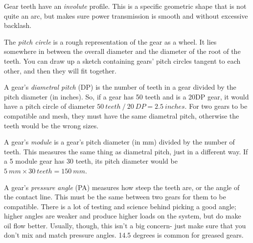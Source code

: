\documentclass[10pt,letterpaper]{book}
\begin{document}
\begin{asparaenum}[a)]
	\item Gear teeth have an \textit{involute} profile. This is a specific geometric shape that is not quite an arc, but makes sure power transmission is smooth and without excessive backlash.
	\item The \textit{pitch circle} is a rough representation of the gear as a wheel. It lies somewhere in between the overall diameter and the diameter of the root of the teeth. You can draw up a sketch containing gears' pitch circles tangent to each other, and then they will fit together.
	\item A gear's \textit{diametral pitch} (DP) is the number of teeth in a gear divided by the pitch diameter (in inches). So, if a gear has 50 teeth and is a 20DP gear, it would have a pitch circle of diameter $50 \ teeth \ / \ 20 \ DP = 2.5 \ inches$. For two gears to be compatible and mesh, they must have the same diametral pitch, otherwise the teeth would be the wrong sizes.
	\item A gear's \textit{module} is a gear's pitch diameter (in mm) divided by the number of teeth. This measures the same thing as diametral pitch, just in a different way. If a 5 module gear has 30 teeth, its pitch diameter would be $5 \ mm \times 30 \ teeth = 150 \ mm$.
	\item A gear's \textit{pressure angle} (PA) measures how steep the teeth are, or the angle of the contact line. This must be the same between two gears for them to be compatible. There is a lot of testing and science behind picking a good angle; higher angles are weaker and produce higher loads on the system, but do make oil flow better. Usually, though, this isn't a big concern- just make sure that you don't mix and match pressure angles. 14.5 degrees is common for greased gears.
\end{asparaenum}
\end{document}
